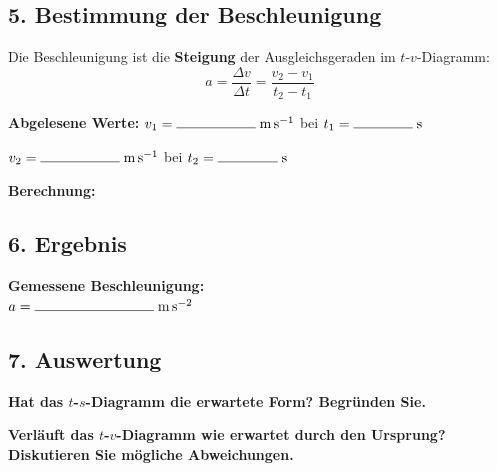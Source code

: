 \documentclass[11pt,a4paper]{scrartcl}
\begin{document}
	\subsection*{5. Bestimmung der Beschleunigung}
	
	\begin{infobox}[title={\faIcon{info-circle} Berechnung aus dem $t$-$v$-Diagramm}]
		Die Beschleunigung ist die \textbf{Steigung} der Ausgleichsgeraden im $t$-$v$-Diagramm:
		\[a = \frac{\Delta v}{\Delta t} = \frac{v_2 - v_1}{t_2 - t_1}\]
	\end{infobox}
	
	\vspace{0.3cm}
	
	\textbf{Abgelesene Werte:} \quad $v_1 = \rule{2cm}{0.4pt}\;\si{\metre\per\second}$ bei $t_1 = \rule{1.5cm}{0.4pt}\;\si{\second}$
	
	\hspace{3.05cm} $v_2 = \rule{2cm}{0.4pt}\;\si{\metre\per\second}$ bei $t_2 = \rule{1.5cm}{0.4pt}\;\si{\second}$
	
	\vspace{0.5cm}
	
	\textbf{Berechnung:}
	
	\vspace{2cm}
	
	\subsection*{6. Ergebnis}
	
	\begin{tcolorbox}[colback=yellow!10!white, colframe=yellow!50!black, width=\textwidth]
		\centering
		\textbf{Gemessene Beschleunigung:}\\[0.3cm]
		{\Large $a = \rule{3cm}{0.4pt}\;\si{\metre\per\second\squared}$}
	\end{tcolorbox}
	
	\vspace{0.5cm}
	
	\subsection*{7. Auswertung}
	
	\textbf{Hat das $t$-$s$-Diagramm die erwartete Form? Begründen Sie.}
	
	\vspace{1.5cm}
	
	\textbf{Verläuft das $t$-$v$-Diagramm wie erwartet durch den Ursprung? Diskutieren Sie mögliche Abweichungen.}
	
\end{document}
